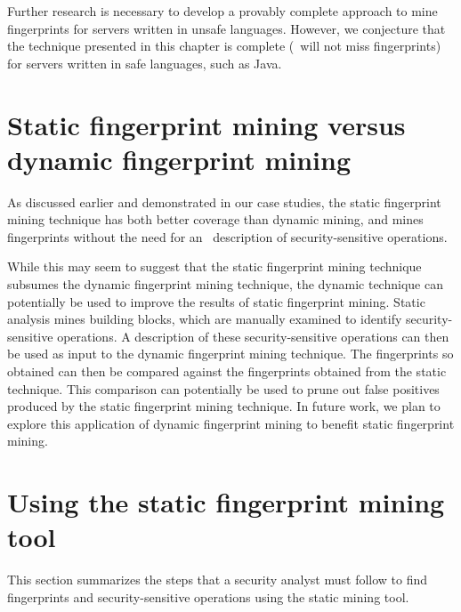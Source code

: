 Further research is necessary to develop a provably complete approach to
mine fingerprints for servers written in unsafe languages. However, we
conjecture that the technique presented in this chapter is complete (\ie~will
not miss fingerprints) for servers written in safe languages, such as Java.


\section{Static fingerprint mining versus dynamic fingerprint mining}
\label{chapter:static:section:comparison}

As discussed earlier and demonstrated in our case studies, the static
fingerprint mining technique has both better coverage than dynamic mining, and
mines fingerprints without the need for an \apriori\ description of
security-sensitive operations. 

While this may seem to suggest that the static fingerprint mining technique
subsumes the dynamic fingerprint mining technique, the dynamic technique can
potentially be used to improve the results of static fingerprint mining.
Static analysis mines building blocks, which are manually examined to identify
security-sensitive operations. A description of these security-sensitive
operations can then be used as input to the dynamic fingerprint mining
technique. The fingerprints so obtained can then be compared against the
fingerprints obtained from the static technique. This comparison can
potentially be used to prune out false positives produced by the static
fingerprint mining technique. In future work, we plan to explore this
application of dynamic fingerprint mining to benefit static fingerprint mining.


\section{Using the static fingerprint mining tool}
\label{chapter:static:usage}

This section summarizes the steps that a security analyst must follow to
find fingerprints and security-sensitive operations using the static mining
tool.

